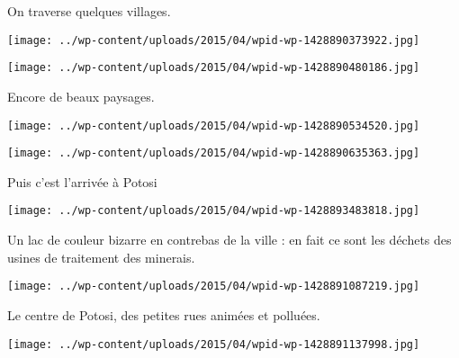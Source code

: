  On traverse quelques villages.

 

\begin{center} \texttt{[image: ../wp-content/uploads/2015/04/wpid-wp-1428890373922.jpg]} \end{center}



 

\begin{center} \texttt{[image: ../wp-content/uploads/2015/04/wpid-wp-1428890480186.jpg]} \end{center}



 Encore de beaux paysages. 

 

\begin{center} \texttt{[image: ../wp-content/uploads/2015/04/wpid-wp-1428890534520.jpg]} \end{center}



 

\begin{center} \texttt{[image: ../wp-content/uploads/2015/04/wpid-wp-1428890635363.jpg]} \end{center}



 Puis c'est l'arrivée à Potosi

 

\begin{center} \texttt{[image: ../wp-content/uploads/2015/04/wpid-wp-1428893483818.jpg]} \end{center}



 Un lac de couleur bizarre en contrebas de la ville : en fait ce sont les déchets des usines de traitement des minerais.

 

\begin{center} \texttt{[image: ../wp-content/uploads/2015/04/wpid-wp-1428891087219.jpg]} \end{center}



 Le centre de Potosi, des petites rues animées et polluées. 

 

\begin{center} \texttt{[image: ../wp-content/uploads/2015/04/wpid-wp-1428891137998.jpg]} \end{center}



